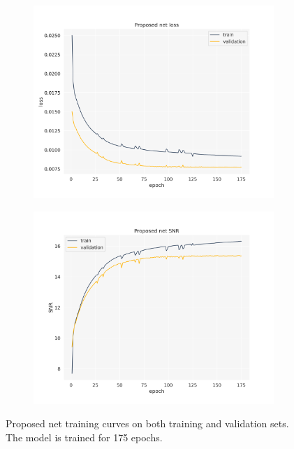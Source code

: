 \begin{figure}[!htb]
	\begin{subfigure}{.5\textwidth}
		\centering
		\includegraphics[width=1.05\linewidth]{img/gionet_loss.png}
		\label{fig:gionet_loss}
	\end{subfigure}%
	\begin{subfigure}{.5\textwidth}
		\centering
		\includegraphics[width=1.05\linewidth]{img/gionet_snr.png}
		\label{fig:gionet_snr}
	\end{subfigure}%
	\caption{Proposed net training curves on both training and validation sets. The model is trained for 175 epochs.}
	\label{fig:proposed_training_curves}
\end{figure}

